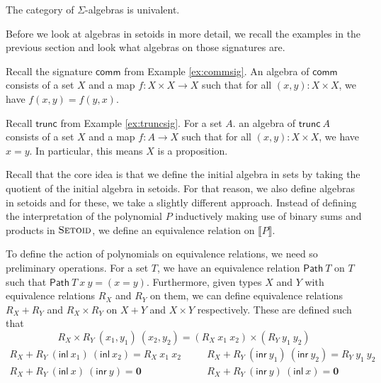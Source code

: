 \documentclass[9pt]{entcs}
\newcommand{\term}[1]{\mathsf{#1}}
\newcommand{\category}[1]{\textsc{#1}}
\newcommand{\function}[1]{\mathsf{#1}}
\newcommand{\0}{\textbf{0}} %
\newcommand{\1}{\textbf{1}} %
\newcommand{\inl}{\term{inl}} %
\newcommand{\inr}{\term{inr}} %
\newcommand{\setoids}{\category{Setoid}} %
\newcommand{\pathR}[1]{\function{Path} \> #1} %
\newcommand{\sumR}[2]{#1 + #2} %
\newcommand{\prodR}[2]{#1 \times #2} %
\newcommand{\comm}{\function{comm}}
\newcommand{\trunc}{\function{trunc}}
\newcommand{\semP}[1]{\llbracket #1 \rrbracket} %
\begin{document}
\begin{proposition}
\label{prop:univalg}
The category of $\Sigma$-algebras is univalent.
\end{proposition}

Before we look at algebras in setoids in more detail, we recall the examples in the previous section and look what algebras on those signatures are.

\begin{example}
\label{ex:commalg}
Recall the signature $\comm$ from Example \ref{ex:commsig}.
An algebra of $\comm$ consists of a set $X$ and a map $f : X \times X \rightarrow X$ such that for all $(x , y) : X \times X$, we have $f(x, y) = f(y, x)$.
\end{example}

\begin{example}
\label{ex:truncalg}
Recall $\trunc$ from Example \ref{ex:truncsig}.
For a set $A$. an algebra of $\trunc \> A$ consists of a set $X$ and a map $f : A \rightarrow X$ such that for all $(x , y) : X \times X$, we have $x = y$.
In particular, this means $X$ is a proposition.
\end{example}

Recall that the core idea is that we define the initial algebra in sets by taking the quotient of the initial algebra in setoids.
For that reason, we also define algebras in setoids and for these, we take a slightly different approach.
Instead of defining the interpretation of the polynomial $P$ inductively making use of binary sums and products in $\setoids$, we define an equivalence relation on $\semP{P}$.

To define the action of polynomials on equivalence relations, we need so preliminary operations.
For a set $T$, we have an equivalence relation $\pathR{T}$ on $T$ such that $\pathR{T} \> x \> y = (x = y)$.
Furthermore, given types $X$ and $Y$ with equivalence relations $R_X$ and $R_Y$ on them, we can define equivalence relations $\sumR{R_X}{R_Y}$ and $\prodR{R_X}{R_Y}$ on $X + Y$ and $X \times Y$ respectively.
These are defined such that
\[
\prodR{R_X}{R_Y} \> (x_1,y_1) \> (x_2,y_2) = (R_X \> x_1 \> x_2) \times (R_Y \> y_1 \> y_2)
\]
\[
\begin{array}{ccc}
\sumR{R_X}{R_Y} \> (\inl \> x_1) \> (\inl \> x_2) = R_X \> x_1 \> x_2 & \quad & \sumR{R_X}{R_Y} \> (\inr \> y_1) \> (\inr \> y_2) = R_Y \> y_1 \> y_2\\
\sumR{R_X}{R_Y} \> (\inl \> x) \> (\inr \> y) = \0 & \quad & \sumR{R_X}{R_Y} \> (\inr \> y) \> (\inl \> x) = \0\\ 
\end{array}
\]
\end{document}
